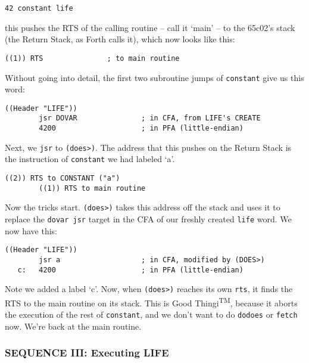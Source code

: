 \begin{lstlisting}[frame=lines]
        42 constant life
\end{lstlisting}

\noindent this pushes the RTS of the calling routine -- call it `main' -- to the 65c02's
stack (the Return Stack, as Forth calls it), which now looks like this:

\begin{lstlisting}[frame=lines]
        ((1)) RTS               ; to main routine 
\end{lstlisting}

\noindent Without going into detail, the first two subroutine jumps of \texttt{constant} give us
this word: 

\begin{lstlisting}[frame=lines]
        ((Header "LIFE"))
        jsr DOVAR               ; in CFA, from LIFE's CREATE
        4200                    ; in PFA (little-endian)
\end{lstlisting}

\noindent Next, we \texttt{jsr} to \texttt{(does>)}. The address that this pushes on the Return Stack is
the instruction of \texttt{constant} we had labeled `a'. 

\begin{lstlisting}[frame=lines]
        ((2)) RTS to CONSTANT ("a") 
        ((1)) RTS to main routine 
\end{lstlisting}

\noindent Now the tricks start. \texttt{(does>)} takes this address off the stack and uses
it to replace the \texttt{dovar jsr} target in the CFA of our freshly created
\texttt{life} word. We now have this: 

\begin{lstlisting}[frame=lines]
        ((Header "LIFE"))
        jsr a                   ; in CFA, modified by (DOES>)
   c:   4200                    ; in PFA (little-endian)
\end{lstlisting}

\noindent Note we added a label `c'. Now, when \texttt{(does>)} reaches its own
\texttt{rts}, it finds the RTS to the main routine on its stack. This is Good
Thingi\textsuperscript{TM}, because it aborts the execution of the rest of
\texttt{constant}, and we don't want to do \texttt{dodoes} or \texttt{fetch}
now.  We're back at the main routine. 


\subsubsection{SEQUENCE III: Executing LIFE}

